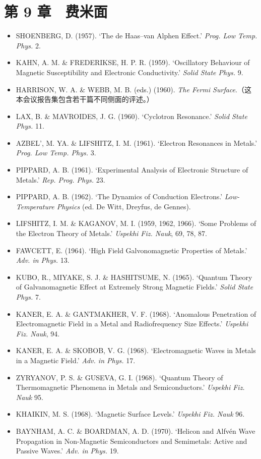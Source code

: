 \section*{第 9 章　费米面}

\begin{itemize}[leftmargin=2em, itemsep=0.2em]
\item SHOENBERG, D. (1957). `The de Haas--van Alphen Effect.' \emph{Prog. Low Temp. Phys.} 2.
\item KAHN, A. M. \& FREDERIKSE, H. P. R. (1959). `Oscillatory Behaviour of Magnetic Susceptibility and Electronic Conductivity.' \emph{Solid State Phys.} 9.
\item HARRISON, W. A. \& WEBB, M. B. (eds.) (1960). \emph{The Fermi Surface}.（这本会议报告集包含若干篇不同侧面的评述。）
\item LAX, B. \& MAVROIDES, J. G. (1960). `Cyclotron Resonance.' \emph{Solid State Phys.} 11.
\item AZBEL', M. YA. \& LIFSHITZ, I. M. (1961). `Electron Resonances in Metals.' \emph{Prog. Low Temp. Phys.} 3.
\item PIPPARD, A. B. (1961). `Experimental Analysis of Electronic Structure of Metals.' \emph{Rep. Prog. Phys.} 23.
\item PIPPARD, A. B. (1962). `The Dynamics of Conduction Electrons.' \emph{Low-Temperature Physics} (ed. De Witt, Dreyfus, de Gennes).
\item LIFSHITZ, I. M. \& KAGANOV, M. I. (1959, 1962, 1966). `Some Problems of the Electron Theory of Metals.' \emph{Uspekhi Fiz. Nauk}, 69, 78, 87.
\item FAWCETT, E. (1964). `High Field Galvonomagnetic Properties of Metals.' \emph{Adv. in Phys.} 13.
\item KUBO, R., MIYAKE, S. J. \& HASHITSUME, N. (1965). `Quantum Theory of Galvanomagnetic Effect at Extremely Strong Magnetic Fields.' \emph{Solid State Phys.} 7.
\item KANER, E. A. \& GANTMAKHER, V. F. (1968). `Anomalous Penetration of Electromagnetic Field in a Metal and Radiofrequency Size Effects.' \emph{Uspekhi Fiz. Nauk}, 94.
\item KANER, E. A. \& SKOBOB, V. G. (1968). `Electromagnetic Waves in Metals in a Magnetic Field.' \emph{Adv. in Phys.} 17.
\item ZYRYANOV, P. S. \& GUSEVA, G. I. (1968). `Quantum Theory of Thermomagnetic Phenomena in Metals and Semiconductors.' \emph{Uspekhi Fiz. Nauk} 95.
\item KHAIKIN, M. S. (1968). `Magnetic Surface Levels.' \emph{Uspekhi Fiz. Nauk} 96.
\item BAYNHAM, A. C. \& BOARDMAN, A. D. (1970). `Helicon and Alfvén Wave Propagation in Non-Magnetic Semiconductors and Semimetals: Active and Passive Waves.' \emph{Adv. in Phys.} 19.
\end{itemize}

